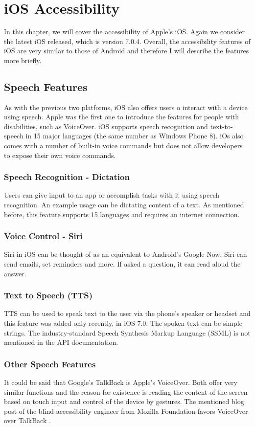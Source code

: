 \section{iOS Accessibility}
In this chapter, we will cover the accessibility of Apple's iOS. Again we consider the latest iOS released, which is version 7.0.4. Overall, the accessibility features of iOS are very similar to those of Android and therefore I will describe the features more briefly.
\subsection{Speech Features}
As with the previous two platforms, iOS also offers users o interact with a device using speech. Apple was the first one to introduce the features for people with disabilities, such as VoiceOver. iOS supports speech recognition and text-to-speech in 15 major languages (the same number as Windows Phone 8).
iOs also comes with a number of built-in voice commands but does not allow developers to expose their own voice commands.
\subsubsection{Speech Recognition - Dictation}
Users can give input to an app or accomplish tasks with it using speech recognition. An example usage can be dictating content of a text. As mentioned before, this feature supports 15 languages and requires an internet connection.
\subsubsection{Voice Control - Siri}
Siri in iOS can be thought of as an equivalent to Android's Google Now. Siri can send emails, set reminders and more. If asked a question, it can read aloud the answer. 
\subsubsection{Text to Speech (TTS)}
TTS can be used to speak text to the user via the phone's speaker or headset and this feature was added only recently, in iOS 7.0. The spoken text can be simple strings. The industry-standard Speech Synthesis Markup Language (SSML) is not mentioned in the API documentation.
\subsubsection{Other Speech Features}
It could be said that Google's TalkBack is Apple's VoiceOver. Both offer very similar functions and the reason for existence is reading the content of the screen based on touch input and control of the device by gestures.
The mentioned blog post of the blind accessibility engineer from Mozilla Foundation favors VoiceOver over TalkBack \cite{mozillaguy}.

